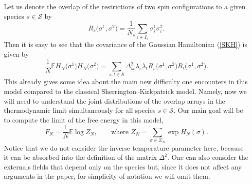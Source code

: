 \documentclass[aop,MSNbibl,dvips]{arximspdf}
\def\cal{\mathscr}
\newcommand{\spe}{{\cal S}}
\newcommand{\smsp}{}
\newcommand{\e}{\mathbb{E}}
\begin{document}
%
Let us denote the overlap of the restrictions of two spin
configurations to a given species $s\in\spe$ by
%
\begin{equation}
R_s\bigl(\sigma^1,\sigma^2\bigr) =
\frac{1}{N_s} \sum_{i\in I_s} \sigma_i^1
\sigma_i^2. \label{overlap}
\end{equation}
%
Then it is easy to see that the covariance of the Gaussian Hamiltonian
(\ref{SKH}) is given by
%
\begin{equation}
\frac{1}{N} \e H_N\bigl(\sigma^1
\bigr)H_N\bigl(\sigma^2\bigr) = \sum
_{s,t\in\spe} \Delta_{st}^2
\lambda_s \lambda_t R_s\bigl(\sigma
^1,\sigma ^2\bigr) R_t\bigl(
\sigma^1,\sigma^2\bigr). \label{Cov}
\end{equation}
%
This already gives some idea about the main new difficulty one
encounters in this model compared to the classical
Sherrington--Kirkpatrick model. Namely, now we will need to understand
the joint distributions of the overlap arrays in the thermodynamic
limit simultaneously for all species $s\in\spe$. Our main goal will be
to compute the limit of the free energy in this model,
%
\begin{equation}
F_N = \frac{1}{N}\smsp\e\log Z_N,\qquad \mbox{where }
Z_N = \sum_{\sigma\in\Sigma_N } \exp H_N(
\sigma). \label{FE}
\end{equation}
%
Notice that we do not consider the inverse temperature parameter here,
because it can be absorbed into the definition of the matrix $\Delta
^2$. One can also consider the externals fields that depend only on the
species but, since it does not affect any arguments in the paper, for
simplicity of notation we will omit them.
\end{document}
